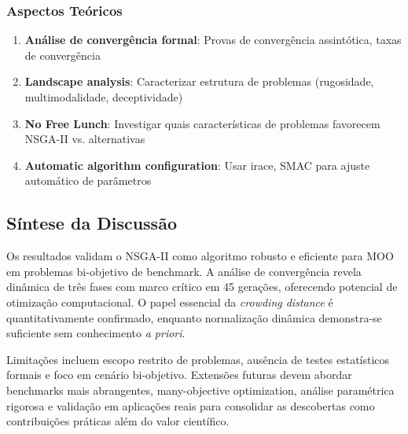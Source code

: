 \subsubsection{Aspectos Teóricos}

\begin{enumerate}
    \item \textbf{Análise de convergência formal}: Provas de convergência assintótica, taxas de convergência
    
    \item \textbf{Landscape analysis}: Caracterizar estrutura de problemas (rugosidade, multimodalidade, deceptividade)
    
    \item \textbf{No Free Lunch}: Investigar quais características de problemas favorecem NSGA-II vs. alternativas
    
    \item \textbf{Automatic algorithm configuration}: Usar irace, SMAC para ajuste automático de parâmetros
\end{enumerate}

\subsection{Síntese da Discussão}

Os resultados validam o NSGA-II como algoritmo robusto e eficiente para MOO em problemas bi-objetivo de benchmark. A análise de convergência revela dinâmica de três fases com marco crítico em 45 gerações, oferecendo potencial de otimização computacional. O papel essencial da \textit{crowding distance} é quantitativamente confirmado, enquanto normalização dinâmica demonstra-se suficiente sem conhecimento \textit{a priori}. 

Limitações incluem escopo restrito de problemas, ausência de testes estatísticos formais e foco em cenário bi-objetivo. Extensões futuras devem abordar benchmarks mais abrangentes, many-objective optimization, análise paramétrica rigorosa e validação em aplicações reais para consolidar as descobertas como contribuições práticas além do valor científico.
